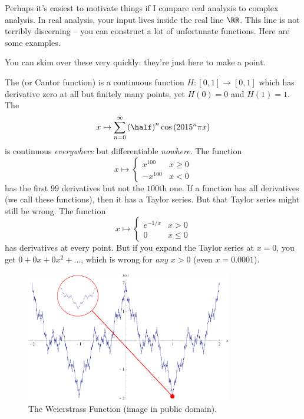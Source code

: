 Perhaps it's easiest to motivate things if I compare real analysis to complex analysis.
In real analysis, your input lives inside the real line $\RR$.
This line is not terribly discerning -- you can construct a lot of unfortunate functions.
Here are some examples.
\begin{example}
	You can skim over these very quickly: they're just here to make a point.
	\begin{enumerate}[(a)]
		\ii The  (or Cantor function) is a continuous function $H : [0,1] \to [0,1]$
		which has derivative zero at all but finitely many points, yet $H(0) = 0$ and $H(1) = 1$.
		\ii The 
		\[ x \mapsto \sum_{n=0}^\infty \left( \half \right)^n \cos \left( 2015^n \pi x \right) \]
		is continuous \emph{everywhere} but differentiable \emph{nowhere}.
		\ii The function
		\[
			x \mapsto 
			\begin{cases}
				x^{100} & x \ge 0 \\
				-x^{100} & x < 0
			\end{cases}
		\]
		has the first $99$ derivatives but not the $100$th one.
		\ii
		If a function has all derivatives (we call these  functions),
		then it has a Taylor series. But that Taylor series might still be wrong. The function
		\[ x \mapsto
			\begin{cases}
				e^{-1/x} & x > 0 \\
				0 & x \le 0
			\end{cases}
		\]
		has derivatives at every point.
		But if you expand the Taylor series at $x=0$, you get $0 + 0x + 0x^2 + \dots$,
		which is wrong for \emph{any} $x > 0$ (even $x=0.0001$).
	\end{enumerate}
\end{example}
\begin{figure}[h]
	\centering
	\includegraphics[width=0.8\textwidth]{media/weierstrass-pubdomain.png}
	\caption{The Weierstrass Function (image in public domain).}
\end{figure}

